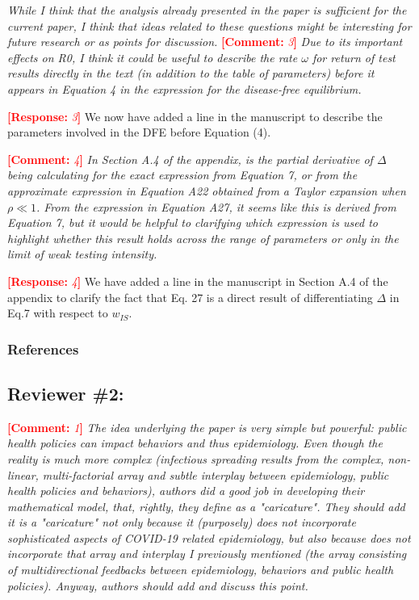 \documentclass[12pt]{article}
\newcommand{\comment}{\showcomment}
\newcommand{\showcomment}[3]{\textcolor{#1}{\textbf{[#2: }\textsl{#3}\textbf{]}}}
\DeclareRobustCommand\_{\ifmmode\expandafter\subtxt\else\textunderscore\fi}
\newcommand{\com}[1]{\comment{red}{Comment}{#1}} %
\newcommand{\res}[1]{\comment{red}{Response}{#1}} %
\begin{document}

{\it While I think that the analysis already presented in the paper is sufficient for the current paper, I think that ideas related to these questions might be interesting for future research or as points for discussion.}
\com 3 
{\it Due to its important effects on R0, I think it could be useful to describe the rate $\omega$ for return of test results directly in the text (in addition to the table of parameters) before it appears in Equation 4 in the expression for the disease-free equilibrium.}
 
\res 3
We now have added a line in the manuscript to describe the parameters involved in the DFE before Equation (4).

\com 4
{\it In Section A.4 of the appendix, is the partial derivative of $\Delta$ being calculating for the exact expression from Equation 7, or from the approximate expression in Equation A22 obtained from a Taylor expansion when $\rho \ll 1$. From the expression in Equation A27, it seems like this is derived from Equation 7, but it would be helpful to clarifying which expression is used to highlight whether this result holds across the range of parameters or only in the limit of weak testing intensity.}

\res 4
We have added a line in the manuscript in Section A.4 of the appendix to clarify the fact that Eq. 27 is a direct result of differentiating $\Delta$ in Eq.7 with respect to $w_{IS}$.

\subsubsection*{References}



\subsection*{Reviewer \#2:}
\com 1 
{\it The idea underlying the paper is very simple but powerful: public health policies can impact behaviors and thus epidemiology. Even though the reality is much more complex (infectious spreading results from the complex, non-linear, multi-factorial array and subtle interplay between epidemiology, public health policies and behaviors), authors did a good job in developing their mathematical model, that, rightly, they define as a "caricature". They should add it is a "caricature" not only because it (purposely) does not incorporate sophisticated aspects of COVID-19 related epidemiology, but also because does not incorporate that array and interplay I previously mentioned (the array consisting of multidirectional feedbacks between epidemiology, behaviors and public health policies). Anyway, authors should add and discuss this point.}
\end{document}

